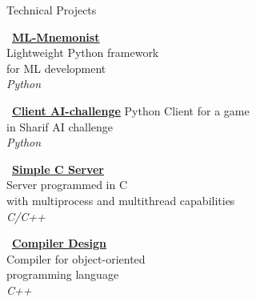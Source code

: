 \documentclass{resume} %
\begin{document}
\begin{rSection}{Technical Projects}
\begin{footnotesize}
\begin{minipage}[t]{1.8in}
\begin{center}
\vspace{0.1cm}
    \faGithub \ \href{https://github.com/HamidrezaKmK/ML-Mnemonist}{\bf \underline{ML-Mnemonist}}\\
    Lightweight Python framework\\
    for ML development\\
    \textcolor{Black!70}{\it Python}
\end{center}
\end{minipage}
\hspace{0.1cm}
\begin{minipage}[t]{1.6in}
\begin{center}
\vspace{0.1cm}
\faGithub \ \href{https://github.com/SharifAIChallenge/AIC20-Client-Python}{\bf \underline{Client AI-challenge}}
Python Client for a game\\
in Sharif AI challenge\\
\textcolor{Black!70}{\it Python}
\end{center}
\end{minipage}
\hspace{0.1cm}
\begin{minipage}[t]{1.6in}
\begin{center}
\vspace{0.1cm}
\faGithub \ \href{https://github.com/HamidrezaKmK/SimpleCServer/}{\bf \underline{Simple C Server}} \\
Server programmed in C\\ 
with multiprocess and multithread capabilities\\
\textcolor{Black!70}{\it C/C++}
\end{center}
\end{minipage}
\hspace{0.1cm}
\begin{minipage}[t]{1.6in}
\begin{center}
\vspace{0.1cm}
    \faGithub \ \href{https://github.com/MostafaOjaghi/DecafCompiler}{\bf \underline{Compiler Design}}\\
    Compiler for object-oriented \\
    programming language\\
    \textcolor{Black!70}{\it C++}
\end{center}
\end{minipage}
\end{footnotesize}
\end{rSection}
\end{document}

